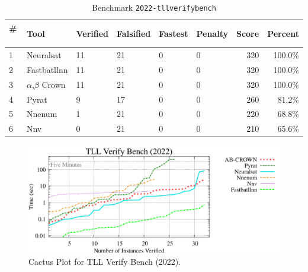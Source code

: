 
\begin{table}[h]
\begin{center}
\caption{Benchmark \texttt{2022-tllverifybench}} \label{tab:cat_{cat}}
{\setlength{\tabcolsep}{2pt}
\begin{tabular}[h]{@{}llllllrr@{}}
\toprule
\textbf{\# ~} & \textbf{Tool} & \textbf{Verified} & \textbf{Falsified} & \textbf{Fastest} & \textbf{Penalty} & \textbf{Score} & \textbf{Percent}\\
\midrule
1 & Neuralsat & 11 & 21 & 0 & 0 & 320 & 100.0\% \\
2 & Fastbatllnn & 11 & 21 & 0 & 0 & 320 & 100.0\% \\
3 & $\alpha$,$\beta$ Crown & 11 & 21 & 0 & 0 & 320 & 100.0\% \\
4 & Pyrat & 9 & 17 & 0 & 0 & 260 & 81.2\% \\
5 & Nnenum & 1 & 21 & 0 & 0 & 220 & 68.8\% \\
6 & Nnv & 0 & 21 & 0 & 0 & 210 & 65.6\% \\
\bottomrule
\end{tabular}
}
\end{center}
\end{table}



\begin{figure}[h]
\centerline{\includegraphics[width=\textwidth]{cactus/2022_tllverifybench.pdf}}
\caption{Cactus Plot for TLL Verify Bench (2022).}
\label{fig:quantPic}
\end{figure}



